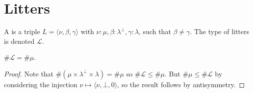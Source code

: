 \section{Litters}

\begin{definition}
    A  is a triple \( L = \langle \nu, \beta, \gamma \rangle \) with \( \nu : \mu, \beta : \lambda^\bot, \gamma : \lambda \), such that \( \beta \neq \gamma \).
    The type of litters is denoted \( \mathcal L \).
\end{definition}
\begin{lemma}
    \label{lem:mk_litter}
    \( \#\mathcal L = \#\mu \).
\end{lemma}
\begin{proof}
    Note that \( \#(\mu \times \lambda^\bot \times \lambda) = \#\mu \) so \( \#\mathcal L \leq \#\mu \).
    But \( \#\mu \leq \#\mathcal L \) by considering the injection \( \nu \mapsto \langle \nu, \bot, 0 \rangle \), so the result follows by antisymmetry.
\end{proof}

